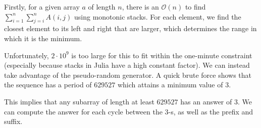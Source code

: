 \documentclass{article}
\begin{document}
Firstly, for a given array $a$ of length $n$, there is an $\mathcal{O}(n)$ to find $\sum_{i=1}^n\sum_{j=i}^nA(i,j)$ using monotonic stacks. For each element, we find the closest element to its left and right that are larger, which determines the range in which it is the minimum. 

Unfortunately, $2\cdot 10^9$ is too large for this to fit within the one-minute constraint (especially because stacks in Julia have a high constant factor). We can instead take advantage of the pseudo-random generator. A quick brute force shows that the sequence has a period of $629527$ which attains a minimum value of $3$. 

This implies that any subarray of length at least $629527$ has an answer of $3$. We can compute the answer for each cycle between the $3$-s, as well as the prefix and suffix.
\end{document}

